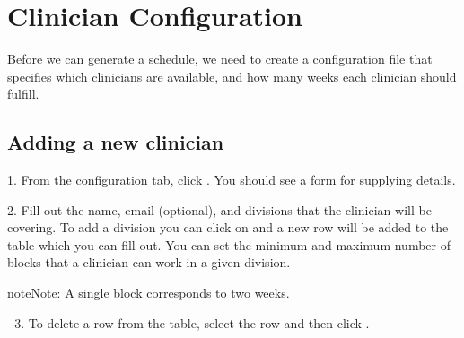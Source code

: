\documentclass[letterpaper,10pt,english]{sphinxmanual}
\begin{document}
\section{Clinician Configuration}
\label{\detokenize{index:clinician-configuration}}
Before we can generate a schedule, we need to create a configuration file
that specifies which clinicians are available, and how many weeks each
clinician should fulfill.


\subsection{Adding a new clinician}
\label{\detokenize{index:adding-a-new-clinician}}
1. From the configuration tab, click . You should see a
form for supplying details.

\begin{figure}[htbp]
\centering
{}\end{figure}

\begin{DUlineblock}{0em}
\item[] 
\end{DUlineblock}

2. Fill out the name, email (optional), and divisions that the clinician
will be covering. To add a division you can click on  and a new row
will be added to the table which you can fill out. You can set the minimum
and maximum number of blocks that a clinician can work in a given division.

\begin{sphinxadmonition}{note}{Note:}
A single block corresponds to two weeks.
\end{sphinxadmonition}

\begin{figure}[htbp]
\centering
{}\end{figure}

\begin{DUlineblock}{0em}
\item[] 
\end{DUlineblock}
\begin{enumerate}
\setcounter{enumi}{2}
\item {} 
To delete a row from the table, select the row and then click .

\end{enumerate}
\end{document}
